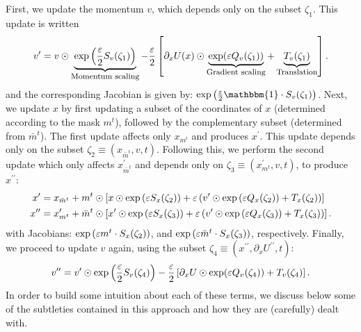 \documentclass[../main.tex]{subfiles}
\begin{document}
First, we update the momentum $v$, which depends only on the subset $\zeta_1$.
%
This update is written
%
\begin{equation}
  \vp = v \odot 
    \underbrace{\exp\left(\frac{\varepsilon}{2} S_{v}(\zeta_1)\right)}_{\text{\footnotesize{Momentum scaling}}}%
    - \frac{\varepsilon}{2}\left[\partial_{x} U(x)%
    \odot\underbrace{\exp(\varepsilon Q_{v}(\zeta_1))}_{\text{\footnotesize{Gradient scaling}}}%
    + \underbrace{T_v(\zeta_1)}_{\text{\footnotesize{Translation}}}\right].
    \label{eq:update_momentum_forward1}
\end{equation}
%
and the corresponding Jacobian is given by: $\exp{\left(\frac{\eps}{2}\mathbbm{1} \cdot S_{v}(\zeta_1)\right)}$.
%
Next, we update $x$ by first updating a subset of the coordinates of $x$ (determined according to the mask $m^t$),
followed by the complementary subset (determined from $\bar m^{t}$).
%
The first update affects only $x_{m^{t}}$ and produces $x^{\prime}$.
%
This update depends only on the subset $\zeta_2 \equiv (x_{\bar m^t}, v, t)$.
%
Following this, we perform the second update which only affects $x_{\bar{m}^t}^{\prime}$ and depends only on $\zeta_3
\equiv (x_{m^t}^{\prime}, v, t)$, to produce $x^{\prime\prime}$:
%
\begin{align}
  x^{\prime} &= x_{\bar{m}^t} + m^{t}\odot\left[x \odot \exp{(\eps S_x(\zeta_2))} + \eps\left(v^{\prime}\odot%
    \exp{(\eps Q_x(\zeta_2))} + T_x(\zeta_2)\right)\right]\\
  x^{\prime\prime} &= x^{\prime}_{m^t} + \bar m^t \odot \left[x^{\prime} \odot \exp{(\eps S_x(\zeta_3))} +%
    \eps\left(v^{\prime} \odot \exp{(\eps Q_x(\zeta_3))} + T_x(\zeta_3)\right)\right].
\end{align}
%
with Jacobians: $\exp{({\varepsilon}m^{t} \cdot S_x(\zeta_2))}$, and $\exp{({\varepsilon}\bar m^t \cdot S_x(\zeta_3))}$, respectively. 
%
Finally, we proceed to update $v$ again, using the subset $\zeta_4 \equiv (x^{\prime\prime}, \partial_{x}
U^{\prime\prime}, t)$: 
%
\begin{equation} 
  {v^{\prime\prime}} = {v^{\prime}} \odot \exp\left(\frac{\varepsilon}{2} S_v(\zeta_4)\right) - \frac{\varepsilon}{2}\left[\partial_{x} U
  \odot \exp(\varepsilon Q_v(\zeta_4)) + T_v(\zeta_4)\right].
    \label{eq:update_momentum_forward2}
\end{equation}
%
In order to build some intuition about each of these terms, we discuss below some of the subtleties contained in this
approach and how they are (carefully) dealt with.
\end{document}
